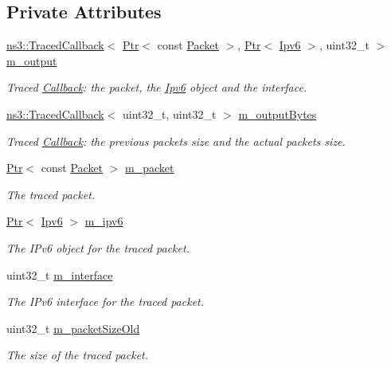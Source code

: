 \subsection*{Private Attributes}
\begin{DoxyCompactItemize}
\item 
\hyperlink{classns3_1_1TracedCallback}{ns3\+::\+Traced\+Callback}$<$ \hyperlink{classns3_1_1Ptr}{Ptr}$<$ const \hyperlink{classns3_1_1Packet}{Packet} $>$, \hyperlink{classns3_1_1Ptr}{Ptr}$<$ \hyperlink{classns3_1_1Ipv6}{Ipv6} $>$, uint32\+\_\+t $>$ \hyperlink{classns3_1_1Ipv6PacketProbe_a690f7294eb5659e15cf1715c508cd387}{m\+\_\+output}
\begin{DoxyCompactList}\small\item\em Traced \hyperlink{classns3_1_1Callback}{Callback}\+: the packet, the \hyperlink{classns3_1_1Ipv6}{Ipv6} object and the interface. \end{DoxyCompactList}\item 
\hyperlink{classns3_1_1TracedCallback}{ns3\+::\+Traced\+Callback}$<$ uint32\+\_\+t, uint32\+\_\+t $>$ \hyperlink{classns3_1_1Ipv6PacketProbe_aad6815016cab1ca0618b9a93534ed4ce}{m\+\_\+output\+Bytes}
\begin{DoxyCompactList}\small\item\em Traced \hyperlink{classns3_1_1Callback}{Callback}\+: the previous packet\textquotesingle{}s size and the actual packet\textquotesingle{}s size. \end{DoxyCompactList}\item 
\hyperlink{classns3_1_1Ptr}{Ptr}$<$ const \hyperlink{classns3_1_1Packet}{Packet} $>$ \hyperlink{classns3_1_1Ipv6PacketProbe_a5e37df4c8dd1ec07133d9ad5954057a4}{m\+\_\+packet}
\begin{DoxyCompactList}\small\item\em The traced packet. \end{DoxyCompactList}\item 
\hyperlink{classns3_1_1Ptr}{Ptr}$<$ \hyperlink{classns3_1_1Ipv6}{Ipv6} $>$ \hyperlink{classns3_1_1Ipv6PacketProbe_a4ad3d2901e3f985bfdb2a124b86bec6d}{m\+\_\+ipv6}
\begin{DoxyCompactList}\small\item\em The I\+Pv6 object for the traced packet. \end{DoxyCompactList}\item 
uint32\+\_\+t \hyperlink{classns3_1_1Ipv6PacketProbe_a601a74ab9e190565ac73f741acd6ec4f}{m\+\_\+interface}
\begin{DoxyCompactList}\small\item\em The I\+Pv6 interface for the traced packet. \end{DoxyCompactList}\item 
uint32\+\_\+t \hyperlink{classns3_1_1Ipv6PacketProbe_a9b6d7c8faebfcf1c9d8ea70712fcd3a8}{m\+\_\+packet\+Size\+Old}
\begin{DoxyCompactList}\small\item\em The size of the traced packet. \end{DoxyCompactList}\end{DoxyCompactItemize}
